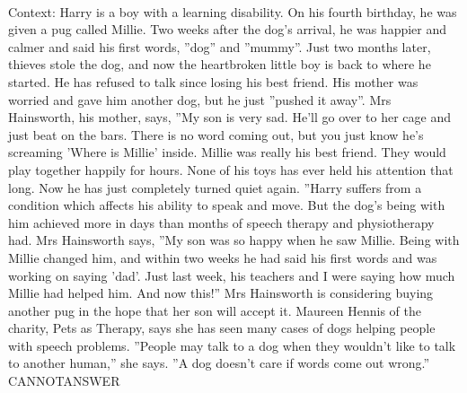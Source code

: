 \documentclass[11pt,a4paper, onecolumn]{article}
\begin{document}
\\ Context: Harry is a boy with a learning disability. On his fourth birthday, he was given a pug called Millie. Two weeks after the dog's arrival, he was happier and calmer and said his first words, ''dog'' and ''mummy''. Just two months later, thieves stole the dog, and now the heartbroken little boy is back to where he started. He has refused to talk since losing his best friend. His mother was worried and gave him another dog, but he just ''pushed it away''. Mrs Hainsworth, his mother, says, ''My son is very sad. He'll go over to her cage and just beat on the bars. There is no word coming out, but you just know he's screaming 'Where is Millie' inside. Millie was really his best friend. They would play together happily for hours. None of his toys has ever held his attention that long. Now he has just completely turned quiet again. ''Harry suffers from a condition which affects his ability to speak and move. But the dog's being with him achieved more in days than months of speech therapy and physiotherapy had. Mrs Hainsworth says, ''My son was so happy when he saw Millie. Being with Millie changed him, and within two weeks he had said his first words and was working on saying 'dad'. Just last week, his teachers and I were saying how much Millie had helped him. And now this!'' Mrs Hainsworth is considering buying another pug in the hope that her son will accept it. Maureen Hennis of the charity, Pets as Therapy, says she has seen many cases of dogs helping people with speech problems. ''People may talk to a dog when they wouldn't like to talk to another human,'' she says. ''A dog doesn't care if words come out wrong.'' CANNOTANSWER
\end{document}
